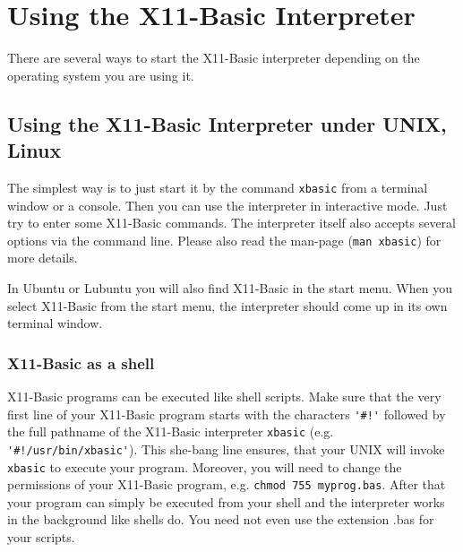 \section{Using the X11-Basic Interpreter}

There are several ways to start the X11-Basic interpreter depending on the
operating system you are using it.

\subsection{Using the X11-Basic Interpreter under UNIX, Linux}

The simplest way is to just start it by the command \verb|xbasic| from a
terminal window or a console. Then you can use the interpreter in interactive
mode. Just try to enter some X11-Basic commands. The interpreter itself also
accepts several options via the command line. Please also read the man-page
(\verb|man xbasic|) for more details.

In Ubuntu or Lubuntu you will also find X11-Basic in the start menu. When you
select  X11-Basic from the start menu, the interpreter should come up in its own
terminal window. 

\subsubsection{X11-Basic as a shell}

X11-Basic programs can be executed like shell scripts. Make sure that the very
first line of your X11-Basic program  starts with the characters \verb|'#!'|
followed by the full pathname of the X11-Basic interpreter \verb|xbasic| (e.g.
\verb|'#!/usr/bin/xbasic'|).  This she-bang line ensures, that your UNIX will
invoke \verb|xbasic| to  execute your program. Moreover, you will need to change the
permissions of your X11-Basic program, e.g. \verb|chmod 755 myprog.bas|.  After
that your program can simply be executed from your shell and the interpreter
works in the background like shells do. You need not even use the extension .bas
for your scripts.

